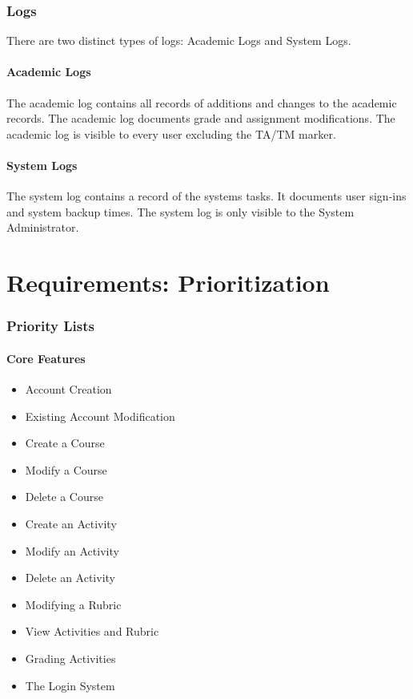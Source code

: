 \documentclass{article}
\begin{document}
\section{Logs}
There are two distinct types of logs: Academic Logs and System Logs.
\subsection{Academic Logs}
The academic log contains all records of additions and changes to the academic records.
The academic log documents grade and assignment modifications.  The academic log
is visible to every user excluding the TA/TM marker.
\subsection{System Logs}
The system log contains a record of the systems tasks.  It documents user sign-ins
and system backup times. The system log is only visible to the System Administrator.

\part{Requirements: Prioritization}
\section{Priority Lists}
\subsection{Core Features}
\begin{itemize}
  \item Account Creation
  \item Existing Account Modification
  \item Create a Course
  \item Modify a Course
  \item Delete a Course
  \item Create an Activity
  \item Modify an Activity
  \item Delete an Activity
  \item Modifying a Rubric
  \item View Activities and Rubric
  \item Grading Activities
  \item The Login System
\end{itemize}
\end{document}
